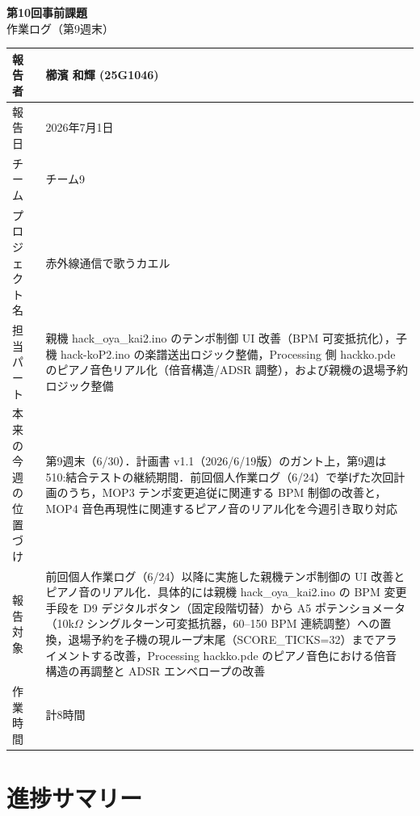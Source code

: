 \documentclass[a4paper,11pt]{ltjsarticle}
\providecommand{\％}{\%}
\begin{document}
\begin{center}
    {\LARGE \textbf{第10回事前課題}}\\[0.4em]
    {\large 作業ログ（第9週末）}\\[1em]
\end{center}

\begin{tabular}{|p{4cm}|p{10cm}|}
\hline
報告者 & 櫛濱 和輝 (25G1046)\\
\hline
報告日 & 2026年7月1日\\
\hline
チーム & チーム9\\
\hline
プロジェクト名 & 赤外線通信で歌うカエル\\
\hline
担当パート & 親機 hack\_oya\_kai2.ino のテンポ制御 UI 改善（BPM 可変抵抗化），子機 hack-koP2.ino の楽譜送出ロジック整備，Processing 側 hackko.pde のピアノ音色リアル化（倍音構造/ADSR 調整），および親機の退場予約ロジック整備\\
\hline
本来の今週の位置づけ & 第9週末（6/30）．計画書 v1.1（2026/6/19版）のガント上，第9週は 510:結合テストの継続期間．前回個人作業ログ（6/24）で挙げた次回計画のうち，MOP3 テンポ変更追従に関連する BPM 制御の改善と，MOP4 音色再現性に関連するピアノ音のリアル化を今週引き取り対応\\
\hline
報告対象 & 前回個人作業ログ（6/24）以降に実施した親機テンポ制御の UI 改善とピアノ音のリアル化．具体的には親機 hack\_oya\_kai2.ino の BPM 変更手段を D9 デジタルボタン（固定段階切替）から A5 ポテンショメータ（10k$\Omega$ シングルターン可変抵抗器，60--150 BPM 連続調整）への置換，退場予約を子機の現ループ末尾（SCORE\_TICKS=32）までアライメントする改善，Processing hackko.pde のピアノ音色における倍音構造の再調整と ADSR エンベロープの改善\\
\hline
作業時間 & 計8時間\\
\hline
\end{tabular}

\vspace{1em}

\section{進捗サマリー}\label{sec:summary}
\end{document}
